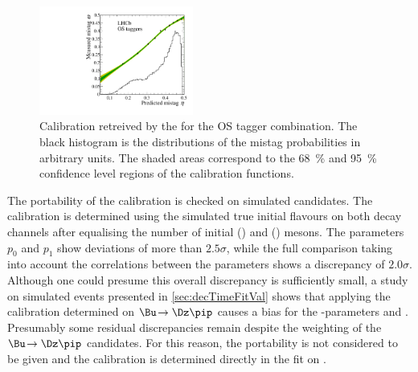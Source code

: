 \begin{figure}[tbp]
	\begin{center}
		\includegraphics[width=0.45\textwidth]{08FlavourTagging/figs/CalibrationOS.pdf}
	\end{center}
	\caption{Calibration retreived by the for the OS tagger combination.
	The black histogram is the distributions of the mistag probabilities in arbitrary units.
	The shaded areas correspond to the \SI{68}{\percent} and \SI{95}{\percent} confidence level regions of the calibration functions.}
	\label{fig:CalibOS}
\end{figure}

The portability of the calibration is checked on simulated candidates.
The calibration is determined using the simulated true initial flavours on both decay channels after equalising the number of initial \Bz (\Bu) and \Bzb (\Bm) mesons.
The parameters $p_0$ and $p_1$ show deviations of more than $2.5\sigma$, while the full comparison taking into account the correlations between the parameters shows a discrepancy of $2.0\sigma$.
Although one could presume this overall discrepancy is sufficiently small, a study on simulated events presented in \cref{sec:decTimeFitVal} shows that applying the calibration determined on $\Bu\!\to\Dz\pip$ causes a bias for the \CP-parameters \Sf and \Sfbar.
Presumably some residual discrepancies remain despite the weighting of the $\Bu\!\to\Dz\pip$ candidates.
For this reason, the portability is not considered to be given and the calibration is determined directly in the \CP fit on \BdToDpi.
